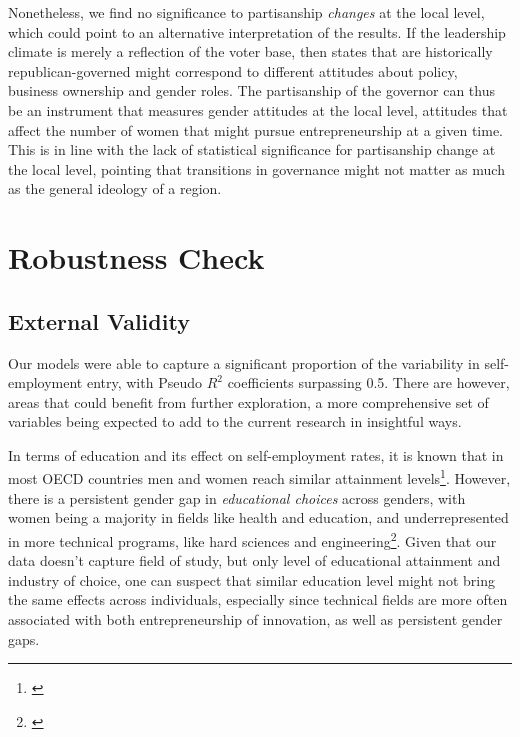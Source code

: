 Nonetheless, we find no significance to partisanship \textit{changes} at the local level, which could point to an alternative interpretation of the results. If the leadership climate is merely a reflection of the voter base, then states that are historically republican-governed might correspond to different attitudes about policy, business ownership and gender roles. The partisanship of the governor can thus be an instrument that measures gender attitudes at the local level, attitudes that affect the number of women that might pursue entrepreneurship at a given time. This is in line with the lack of statistical significance for partisanship change at the local level, pointing that transitions in governance might not matter as much as the general ideology of a region.


\section{Robustness Check}

\subsection{External Validity}

Our models were able to capture a significant proportion of the variability in self-employment entry, with Pseudo $R^2$ coefficients surpassing 0.5. There are however, areas that could benefit from further exploration, a more comprehensive set of variables being expected to add to the current research in insightful ways. 

In terms of education and its effect on self-employment rates, it is known that in most OECD countries men and women reach similar attainment levels\footnote{\cite{charles2002equal}}. However, there is a persistent gender gap in \textit{educational choices} across genders, with women being a majority in fields like health and education, and underrepresented in more technical programs, like hard sciences and engineering\footnote{\cite{charles2002equal}}. Given that our data doesn't capture field of study, but only level of educational attainment and industry of choice, one can suspect that similar education level might not bring the same effects across individuals, especially since technical fields are more often associated with both entrepreneurship of innovation, as well as persistent gender gaps. 


